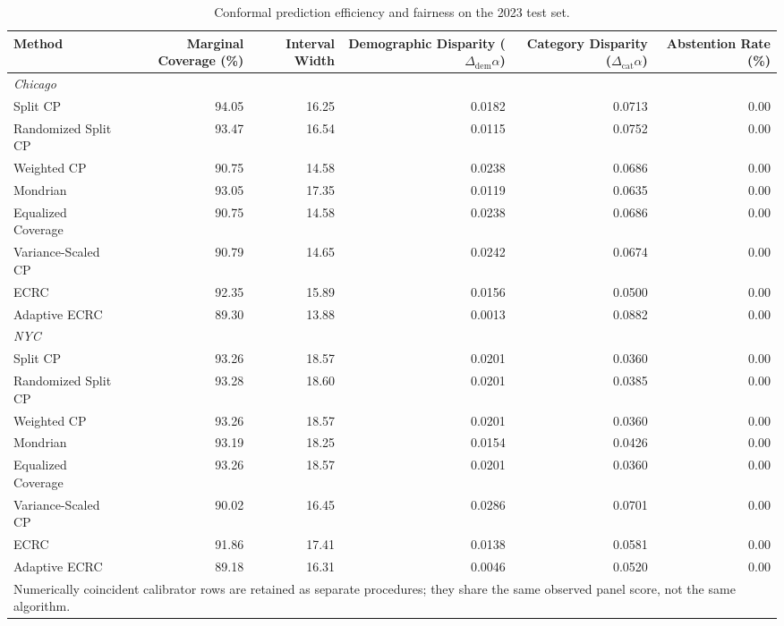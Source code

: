 \begin{table}[htbp]
  \centering
  \caption{Conformal prediction efficiency and fairness on the 2023 test set.}
  \label{tab:conformal_fairness}
  \begin{tabular}{l r r r r r}
    \toprule
    \textbf{Method} & \textbf{Marginal Coverage (\%)} & \textbf{Interval Width} & \textbf{Demographic Disparity ($\Delta_{\mathrm{dem}}\alpha$)} & \textbf{Category Disparity ($\Delta_{\mathrm{cat}}\alpha$)} & \textbf{Abstention Rate (\%)} \\
    \midrule
    \multicolumn{6}{l}{\textit{Chicago}} \\
    \midrule
    Split CP & 94.05 & 16.25 & 0.0182 & 0.0713 & 0.00 \\
    Randomized Split CP & 93.47 & 16.54 & 0.0115 & 0.0752 & 0.00 \\
    Weighted CP & 90.75 & 14.58 & 0.0238 & 0.0686 & 0.00 \\
    Mondrian & 93.05 & 17.35 & 0.0119 & 0.0635 & 0.00 \\
    Equalized Coverage & 90.75 & 14.58 & 0.0238 & 0.0686 & 0.00 \\
    Variance-Scaled CP & 90.79 & 14.65 & 0.0242 & 0.0674 & 0.00 \\
    \textsc{ECRC} & 92.35 & 15.89 & 0.0156 & 0.0500 & 0.00 \\
    Adaptive ECRC & 89.30 & 13.88 & 0.0013 & 0.0882 & 0.00 \\
    \midrule
    \multicolumn{6}{l}{\textit{NYC}} \\
    \midrule
    Split CP & 93.26 & 18.57 & 0.0201 & 0.0360 & 0.00 \\
    Randomized Split CP & 93.28 & 18.60 & 0.0201 & 0.0385 & 0.00 \\
    Weighted CP & 93.26 & 18.57 & 0.0201 & 0.0360 & 0.00 \\
    Mondrian & 93.19 & 18.25 & 0.0154 & 0.0426 & 0.00 \\
    Equalized Coverage & 93.26 & 18.57 & 0.0201 & 0.0360 & 0.00 \\
    Variance-Scaled CP & 90.02 & 16.45 & 0.0286 & 0.0701 & 0.00 \\
    \textsc{ECRC} & 91.86 & 17.41 & 0.0138 & 0.0581 & 0.00 \\
    Adaptive ECRC & 89.18 & 16.31 & 0.0046 & 0.0520 & 0.00 \\
    \midrule
    \multicolumn{6}{l}{\footnotesize Numerically coincident calibrator rows are retained as separate procedures; they share the same observed panel score, not the same algorithm.} \\
    \bottomrule
  \end{tabular}
\end{table}